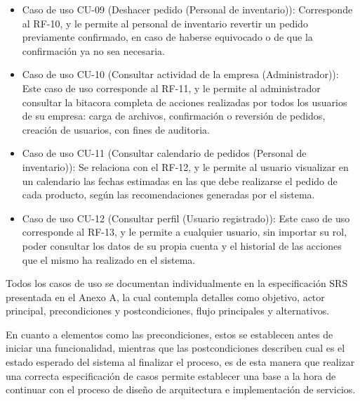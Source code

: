 \begin{itemize}
    \item Caso de uso CU-09 (Deshacer pedido (Personal de inventario)): Corresponde al RF-10, y le permite al personal de inventario revertir un pedido previamente confirmado, en caso de haberse equivocado o de que la confirmación ya no sea necesaria.

    \item Caso de uso CU-10 (Consultar actividad de la empresa (Administrador)): Este caso de uso corresponde al RF-11, y le permite al administrador consultar la bitacora completa de acciones realizadas por todos los usuarios de su empresa: carga de archivos, confirmación o reversión de pedidos, creación de usuarios, con fines de auditoria.

    \item Caso de uso CU-11 (Consultar calendario de pedidos (Personal de inventario)): Se relaciona con el RF-12, y le permite al usuario visualizar en un calendario las fechas estimadas en las que debe realizarse el pedido de cada producto, según las recomendaciones generadas por el sistema.

    \item Caso de uso CU-12 (Consultar perfil (Usuario registrado)): Este caso de uso corresponde al RF-13, y le permite a cualquier usuario, sin importar su rol, poder consultar los datos de su propia cuenta y el historial de las acciones que el mismo ha realizado en el sistema.
\end{itemize}

Todos los casos de uso se documentan individualmente en la especificación SRS presentada en el Anexo A, la cual contempla detalles como objetivo, actor principal, precondiciones y postcondiciones, flujo principales y alternativos.

En cuanto a elementos como las precondiciones, estos se establecen antes de iniciar una funcionalidad, mientras que las postcondiciones describen cual es el estado esperado del sistema al finalizar el proceso, es de esta manera que realizar una correcta especificación de casos permite establecer una base a la hora de continuar con el proceso de diseño de arquitectura e implementación de servicios.
